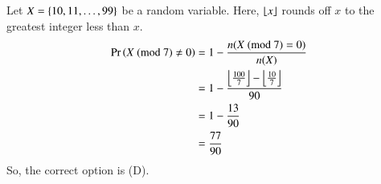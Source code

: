 Let $X = \cbrak{10,11, \ldots, 99}$ be a random variable. Here, $\floor*{x}$ rounds off $x$ to the greatest integer less than $x$.
\begin{align}
    \pr{X \tpmod{7}\neq 0} &= 1 - \frac{n(X \tpmod{7}= 0)}{n(X)}\\
    &= 1 -  \frac{\floor*{\frac{100}{7}}- \floor*{\frac{10}{7}}}{90} \\
    &= 1 - \frac{13}{90}\\
    &= \frac{77}{90}
\end{align}
So, the correct option is (D).